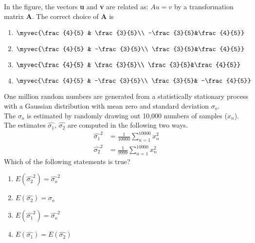 \bigskip
\item In the figure, the vectors \textbf{u} and \textbf{v} are related as: $Au=v$ by a transformation matrix \textbf{A}. The correct choice of \textbf{A} is 
\begin{figure}[H]
\centering
{}%
\end{figure}
\begin{multicols}{2}
\begin{enumerate}
    \item $\myvec{\frac{4}{5} & \frac{3}{5}\\ 
    -\frac{3}{5}&\frac{4}{5}}$
    \item $\myvec{\frac{4}{5} & -\frac{3}{5}\\ 
    \frac{3}{5}&\frac{4}{5}}$
    \item $\myvec{\frac{4}{5} & \frac{3}{5}\\ 
    \frac{3}{5}&\frac{4}{5}}$
    \item $\myvec{\frac{4}{5} & -\frac{3}{5}\\ 
    \frac{3}{5}& -\frac{4}{5}}$
\end{enumerate}
\end{multicols}
\bigskip
\item One million random numbers are generated from a statistically stationary process with a Gaussian distribution with mean zero and standard deviation $\sigma_o$.\\
The $\sigma_o$ is estimated by randomly drawing out 10,000 numbers of samples ($x_n$). The estimates $\hat{\sigma_1}$, $\hat{\sigma_2}$ are computed in the following two ways.
\begin{align*}
    \hat{\sigma_1}^2 &= \frac{1}{10000}\sum_{n=1}^{10000}x_n ^2\\
    \hat{\sigma_2}^2 &= \frac{1}{9999}\sum_{n=1}^{10000}x_n ^2
\end{align*}
Which of the following statements is true?
\begin{multicols}{2}
\begin{enumerate}
    \item $E( \hat{\sigma_2}^2 )= \hat{\sigma_o}^2 $
    \item $E(\hat{\sigma_2})=\sigma_o$
    \item $E( \hat{\sigma_1}^2 )= \hat{\sigma_o}^2 $
    \item $E(\hat{\sigma_1}) = E(\hat{\sigma_2})$
\end{enumerate}
\end{multicols}
